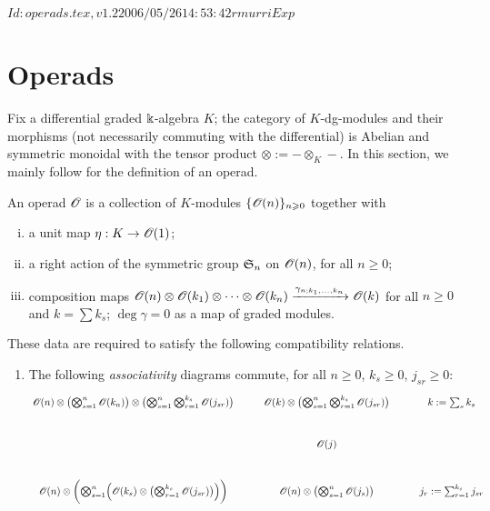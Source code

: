 \RCSID $Id: operads.tex,v 1.2 2006/05/26 14:53:42 rmurri Exp $



\chapter{Operads}
\label{cha:operads}

Fix a differential graded $\Bbbk$-algebra $K$; the category of
$K$-dg-modules and their morphisms (not necessarily commuting with the
differential) is Abelian and symmetric monoidal with the tensor product
$\otimes := - \otimes_K -$.  In this section, we mainly follow
\cite{kriz-may;operads} for the definition of an operad.
\begin{definition}
  \label{dfn:operad}
  An operad ${\mathscr{O}_{}}$ is a collection of $K$-modules $\{{\mathscr{O}_{}}(n)\}_{n\geqslant0}$
  together with 
  \begin{enumerate}[i)]
  \item a unit map $\eta:K \to {\mathscr{O}_{}}(1)$; 
  \item a right action of the symmetric group $\mathfrak{S}_{n}$ on ${\mathscr{O}_{}}(n)$,
    for all $n\geq0$;
  \item composition maps ${\mathscr{O}_{}}(n)\otimes{\mathscr{O}_{}}(k_1)\otimes\cdots\otimes{\mathscr{O}_{}}(k_n) \xrightarrow{\gamma_{n;
        k_1, \ldots, k_n}} {\mathscr{O}_{}}(k)$ for all $n\geq0$ and $k = \sum k_s$; $\deg \gamma
    = 0$ as a map of graded modules.
  \end{enumerate}
  These data are required to satisfy the following compatibility
  relations.
  \begin{enumerate}
  \item\label{o-ass} The following \emph{associativity} diagrams
    commute, for all $n\geq0$, $k_s \geq0$, $j_{sr}\geq0$:
    \begin{equation}
      {\xymatrix{%
          {\Oo}(n) \otimes \bigl( \bigotimes_{s=1}^n {\Oo}(k_n) \bigr) \otimes \bigl( \bigotimes_{s=1}^n
          \bigotimes_{r=1}^{k_s} {\Oo}(j_{sr}) \bigr) 
          &
          {\Oo}(k) \otimes \bigl(\bigotimes_{s=1}^n \bigotimes_{r=1}^{k_s} {\Oo}(j_{sr}) \bigr)
          &
          k := \sum_s k_s
          \\
          &
          {\Oo}(j)
          \\
          {\Oo}(n) \otimes \biggl( \bigotimes_{s=1}^n \Bigl( {\Oo}(k_s) \otimes \bigl(
          \bigotimes_{r=1}^{k_s} {\Oo}(j_{sr}) \bigr) \Bigr) \biggr)
          &
          {\Oo}(n) \otimes \bigl( \bigotimes_{s=1}^n {\Oo}(j_s) \bigr)
          &
          j_r := \sum_{r=1}^{k_s} j_{sr}
}}
\end{equation}
\end{enumerate}
\end{definition}
